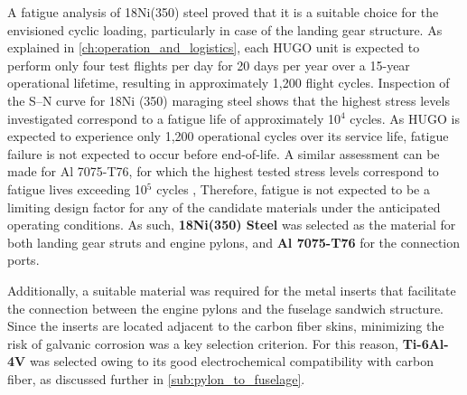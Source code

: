 A fatigue analysis of 18Ni(350) steel proved that it is a suitable choice for the envisioned cyclic loading, particularly in case of the landing gear structure. As explained in \autoref{ch:operation_and_logistics}, each HUGO unit is expected to perform only four test flights per day for 20 days per year over a 15-year operational lifetime, resulting in approximately 1,200 flight cycles. Inspection of the S–N curve for 18Ni (350) maraging steel \cite{Rack1974FatigueMaraging} shows that the highest stress levels investigated correspond to a fatigue life of approximately 10$^4$ cycles. As HUGO is expected to experience only 1,200 operational cycles over its service life, fatigue failure is not expected to occur before end-of-life. A similar assessment can be made for Al 7075-T76, for which the highest tested stress levels correspond to fatigue lives exceeding 10$^5$ cycles \cite{Zalnezhad2012}, 
Therefore, fatigue is not expected to be a limiting design factor for any of the candidate materials under the anticipated operating conditions. As such, \textbf{18Ni(350) Steel} was selected as the material for both landing gear struts and engine pylons, and  \textbf{Al 7075-T76} for the connection ports.

Additionally, a suitable material was required for the metal inserts that facilitate the connection between the engine pylons and the fuselage sandwich structure. Since the inserts are located adjacent to the carbon fiber skins, minimizing the risk of galvanic corrosion was a key selection criterion. For this reason, \textbf{Ti-6Al-4V} was selected owing to its good electrochemical compatibility with carbon fiber, as discussed further in \autoref{sub:pylon_to_fuselage}.




